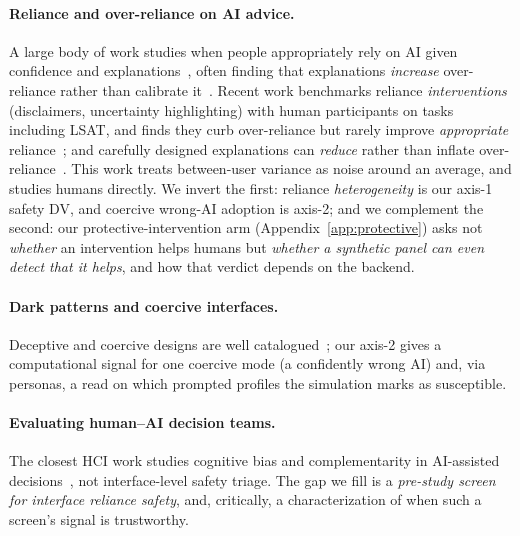 \documentclass[manuscript,review,anonymous]{acmart}
\begin{document}
\paragraph{Reliance and over-reliance on AI advice.} A large body of work studies when people
appropriately rely on AI given confidence and
explanations~\cite{bansal2021whole,bucinca2021trust,zhang2020confidence,lai2019human,schemmer2023appropriate},
often finding that explanations \emph{increase} over-reliance rather than calibrate
it~\cite{bansal2021whole}. Recent work benchmarks reliance
\emph{interventions} (disclaimers, uncertainty highlighting) with human participants on tasks including
LSAT, and finds they curb over-reliance but rarely improve \emph{appropriate}
reliance~\cite{bo2024rely}; and carefully designed explanations can \emph{reduce} rather than inflate
over-reliance~\cite{vasconcelos2023explanations}. This work treats between-user variance as noise
around an average, and studies humans directly. We invert the first: reliance \emph{heterogeneity} is our
axis-1 safety DV, and coercive wrong-AI adoption is axis-2; and we complement the second: our
protective-intervention arm (Appendix~\ref{app:protective}) asks not \emph{whether} an intervention helps
humans but \emph{whether a synthetic panel can even detect that it helps}, and how that verdict depends on
the backend.

\paragraph{Dark patterns and coercive interfaces.} Deceptive and coercive designs are well
catalogued~\cite{luguri2021shining,mildner2023dark}; our axis-2 gives a computational signal for one
coercive mode (a confidently wrong AI) and, via personas, a read on which prompted profiles the
simulation marks as susceptible.

\paragraph{Evaluating human--AI decision teams.} The closest HCI work studies cognitive bias and
complementarity in AI-assisted decisions~\cite{rastogi2022deciding}, not interface-level safety triage. The gap we fill is a \emph{pre-study screen for interface reliance safety},
and, critically, a characterization of when such a screen's signal is trustworthy.
\end{document}
